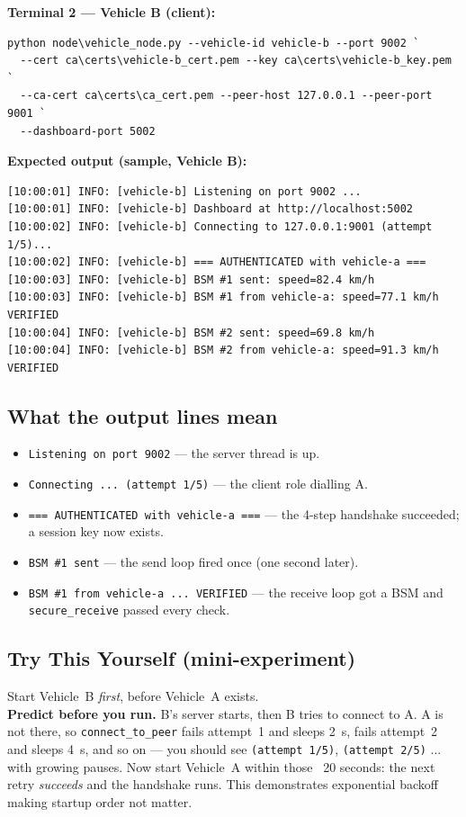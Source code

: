 \documentclass[11pt,a4paper]{article}
\begin{document}
\textbf{Terminal 2 --- Vehicle B (client):}
\begin{lstlisting}[style=term]
python node\vehicle_node.py --vehicle-id vehicle-b --port 9002 `
  --cert ca\certs\vehicle-b_cert.pem --key ca\certs\vehicle-b_key.pem `
  --ca-cert ca\certs\ca_cert.pem --peer-host 127.0.0.1 --peer-port 9001 `
  --dashboard-port 5002
\end{lstlisting}

\noindent\textbf{Expected output (sample, Vehicle B):}
\begin{lstlisting}[style=term]
[10:00:01] INFO: [vehicle-b] Listening on port 9002 ...
[10:00:01] INFO: [vehicle-b] Dashboard at http://localhost:5002
[10:00:02] INFO: [vehicle-b] Connecting to 127.0.0.1:9001 (attempt 1/5)...
[10:00:02] INFO: [vehicle-b] === AUTHENTICATED with vehicle-a ===
[10:00:03] INFO: [vehicle-b] BSM #1 sent: speed=82.4 km/h
[10:00:03] INFO: [vehicle-b] BSM #1 from vehicle-a: speed=77.1 km/h VERIFIED
[10:00:04] INFO: [vehicle-b] BSM #2 sent: speed=69.8 km/h
[10:00:04] INFO: [vehicle-b] BSM #2 from vehicle-a: speed=91.3 km/h VERIFIED
\end{lstlisting}

\subsection{What the output lines mean}
\begin{itemize}
  \item \texttt{Listening on port 9002} --- the server thread is up.
  \item \texttt{Connecting ... (attempt 1/5)} --- the client role dialling A.
  \item \texttt{=== AUTHENTICATED with vehicle-a ===} --- the 4-step handshake
        succeeded; a session key now exists.
  \item \texttt{BSM \#1 sent} --- the send loop fired once (one second later).
  \item \texttt{BSM \#1 from vehicle-a ... VERIFIED} --- the receive loop got a
        BSM and \texttt{secure\_receive} passed every check.
\end{itemize}

\subsection{Try This Yourself (mini-experiment)}
Start Vehicle~B \emph{first}, before Vehicle~A exists.\\
\textbf{Predict before you run.} B's server starts, then B tries to connect to A.
A is not there, so \texttt{connect\_to\_peer} fails attempt~1 and sleeps 2~s,
fails attempt~2 and sleeps 4~s, and so on --- you should see
\texttt{(attempt 1/5)}, \texttt{(attempt 2/5)} ... with growing pauses. Now start
Vehicle~A within those ~20 seconds: the next retry \emph{succeeds} and the
handshake runs. This demonstrates exponential backoff making startup order not
matter.
\end{document}
